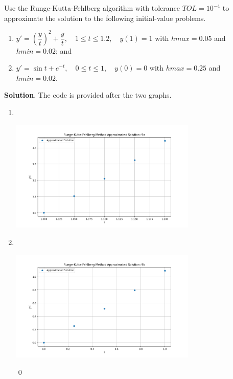 \documentclass[11pt]{article}
\theoremstyle{break}
\numberwithin{equation}{theorem}
\begin{document}
\newpage
\begin{problem}\label{problem 9} %
    Use the Runge-Kutta-Fehlberg algorithm with tolerance $TOL = 10^{-4}$ to approximate the solution to the following initial-value problems.
    \begin{enumerate}
        \item $y'=\left(\dfrac{y}{t}\right)^2+\dfrac{y}{t}, \quad 1\leq t\leq 1.2, \quad y(1)=1$ with $hmax=0.05$ and $hmin=0.02$; and
        \item $y'=\sin t+e^{-t}, \quad 0\leq t\leq 1, \quad y(0)=0$ with $hmax=0.25$ and $hmin=0.02.$
    \end{enumerate}
\end{problem}
\textbf{Solution}. The code is provided after the two graphs.
\begin{enumerate}
    \item $\ $
    \begin{center}
        \includegraphics[width=0.7\textwidth]{P9a.png}
    \end{center}
    \item $\ $
    \begin{center}
        \includegraphics[width=0.7\textwidth]{P9b.png}
    \end{center} \qed
\end{enumerate}
\end{document}
